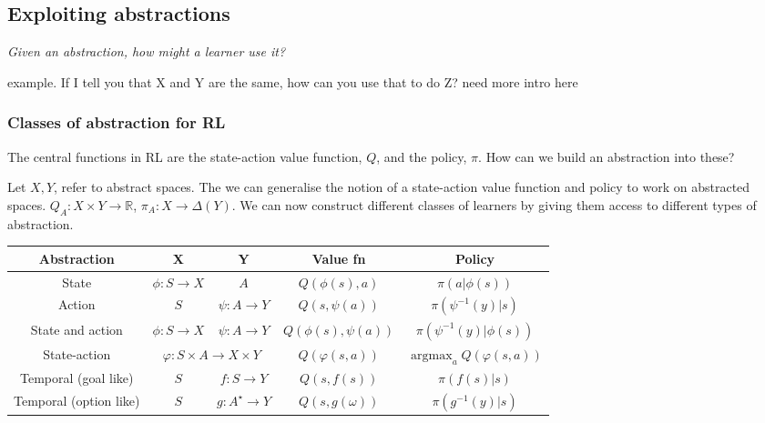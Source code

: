 \subsection{Exploiting abstractions}

%

\begin{displayquote}
\textit{Given an abstraction, how might a learner use it?}
\end{displayquote}

{\color{red}example. If I tell you that X and Y are the same, how can you use that to do Z? need more intro here}

\subsubsection{Classes of abstraction for RL}

The central functions in RL are the state-action value function, $Q$, and the policy, $\pi$.
How can we build an abstraction into these?

Let $X, Y$, refer to abstract spaces.  The we can generalise the notion of a state-action value function and policy to work on abstracted spaces.
$Q_A: X \times Y \to \mathbb R$, $\pi_A: X \to \Delta(Y)$. We can now construct
different classes of learners by giving them access to different types of abstraction.

\begin{changemargin}{-2cm}{-2cm}
  \begin{center}
    \begin{tabular}{ c || c | c | c | c }
      Abstraction & \textbf{X} & \textbf{Y} & \textbf{Value fn} & \textbf{Policy} \\ \hline \hline
      State & $\phi: S \to X$ & $A$ & $Q(\phi(s), a)$ & $\pi(a| \phi(s))$ \\ \hline
      Action & $S$ & $\psi: A \to Y$ & $Q(s, \psi(a))$ & $\pi(\psi^{-1}(y) | s)$\\ \hline
      State and action \footnotemark[5] & $\phi: S \to X$ & $\psi: A \to Y$ & $Q(\phi(s), \psi(a))$ & $\pi(\psi^{-1}(y) | \phi(s))$ \\ \hline
      State-action & \multicolumn{2}{c|}{$\varphi: S\times A \to X\times Y$} & $Q(\varphi(s, a))$ & $\mathop{\text{argmax}}_a Q(\varphi(s, a))$ \\ \hline
      Temporal (goal like) & $S$ & $f: S \to Y$ & $Q(s, f(s))$ &  $\pi(f(s)|s)$ \\ \hline
      Temporal (option like)\footnotemark[10] & $S$ & $g: A^{\star} \to Y$ & $Q(s, g(\omega))$ & $\pi(g^{-1}(y) | s)$ \\ \hline
    \end{tabular}
  \end{center}
\end{changemargin}

